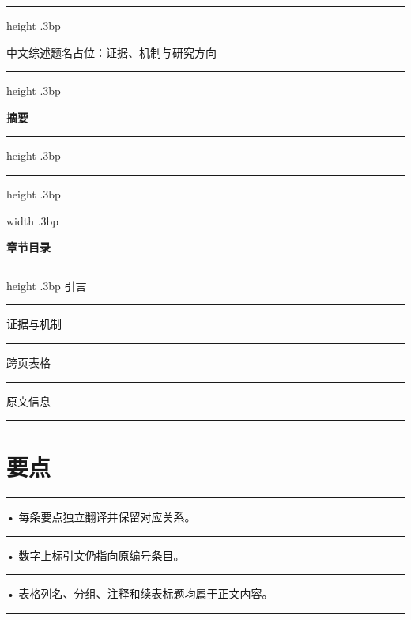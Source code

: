 \documentclass[UTF8,fontset=none,scheme=plain]{ctexart}
\renewcommand{\normalsize}{\fontsize{9bp}{12.1bp}\selectfont}
\begin{document}
\normalsize
\thispagestyle{opening}
\par\vspace{4bp}\hrule height .3bp\vspace{10bp}
{\noindent\fontsize{25bp}{32bp}\selectfont 中文综述题名占位：证据、机制与研究方向\par}\vspace{20bp}
{\noindent\sffamily\bfseries\SampleAuthors\par}\vspace{5bp}\hrule height .3bp\vspace{6bp}
\noindent\begin{minipage}[t][480bp][t]{.745\textwidth}\vspace{0pt}
{\sffamily\bfseries 摘要\par}\vspace{18bp}\hrule height .3bp\vspace{6bp}
{\fontsize{13bp}{19bp}\selectfont\SampleAbstract\par}
\vfill\hrule height .3bp\vspace{5bp}
{\sffamily\fontsize{7.4bp}{10bp}\selectfont\SampleAffiliations\par}
\end{minipage}\hfill\vrule width .3bp\hfill
\begin{minipage}[t][480bp][t]{.23\textwidth}\vspace{0pt}\sffamily
{\bfseries 章节目录\par}\vspace{18bp}\hrule height .3bp\vspace{6bp}
引言\par\vspace{6bp}\hrule\vspace{6bp}
证据与机制\par\vspace{6bp}\hrule\vspace{6bp}
跨页表格\par\vspace{6bp}\hrule\vspace{6bp}
原文信息\par\vspace{6bp}\hrule
\end{minipage}
\clearpage\twocolumn\balance
\section*{要点}
{\sffamily\fontsize{8.5bp}{12bp}\selectfont
\noindent\hrule\vspace{5bp}• 每条要点独立翻译并保留对应关系。\par\vspace{5bp}\hrule\vspace{5bp}
• 数字上标引文仍指向原编号条目。\par\vspace{5bp}\hrule\vspace{5bp}
• 表格列名、分组、注释和续表标题均属于正文内容。\par\vspace{5bp}\hrule}
\SampleOpening
\end{document}
